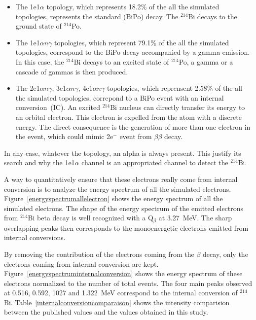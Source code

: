 \documentclass[main.tex]{subfiles}
\begin{document}
\begin{itemize}
\item The 1e1$\alpha$ topology, which represents 18.2$\%$ of the all the simulated topologies, represents the standard (BiPo) decay. The $^{\text{214}}$Bi decays to the ground state of $^{\text{214}}$Po.


\item The 1e1$\alpha n\gamma$ topologies, which represent 79.1$\%$ of the all the simulated topologies, correspond to the BiPo decay accompanied by a gamma emission. In this case, the $^{\text{214}}$Bi decays to an excited state of $^{\text{214}}$Po, a gamma or a cascade of gammas is then produced.


\item The 2e1$\alpha n\gamma$, 3e1$\alpha n\gamma$, 4e1$\alpha n\gamma$ topologies, which reprensent 2.58$\%$ of the all the simulated topologies, correpond to a BiPo event with an internal conversion~(IC). An excited $^{\text{214}}$Bi nucleus can directly transfer its energy to an orbital electron. This electron is expelled from the atom with a discrete energy. The direct consequence is the generation of more than one electron in the event, which could mimic 2e$^-$ event from $\beta\beta$ decay.


\end{itemize}


\noindent In any case, whatever the topology, an alpha is always present. This justify its search and why the 1e1$\alpha$ channel is an appropriated channel to detect the $^{\text{214}}$Bi.


\bigskip

 
\noindent A way to quantitatively ensure that these electrons really come from internal conversion is to analyze the energy spectrum of all the simulated electrons. Figure~\ref{energyspectrumallelectron} shows the energy spectrum of all the simulated electrons. The shape of the energy spectrum of the emitted electrons from $^{\text{214}}$Bi beta decay is well recognized with a Q$_\beta$ at 3.27~MeV. The sharp overlapping peaks then corresponds to the monoenergetic electrons emitted from internal conversions. 


\bigskip

\noindent By removing the contribution of the electrons coming from the $\beta$ decay, only the electrons coming from internal conversion are kept. Figure~\ref{energyspectruminternalconversion} shows the energy spectrum of these electrons normalized to the number of total events. The four main peaks observed at 0.516, 0.592, 1027 and 1.322~MeV correspond to the internal conversion of $^{\text{214}}$Bi. Table~\ref{internalconversioncomparaison} shows the intensity comparision between the published values \cite{NuclearDataSheet210} and the values obtained in this study. 
\end{document}
